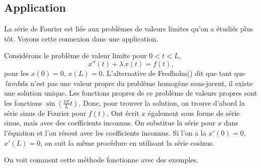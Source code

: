 \subsection{Application}

La série de Fourier est liée aux problèmes de valeurs limites
qu'on a étudiés plus tôt. Voyons cette connexion dans une application.

Considérons le problème de valeur limite pour $0 < t < L$,
\begin{equation*}
x''(t) + \lambda\, x(t) = f(t) ,
\end{equation*}
pour les \emph{}
$x(0) = 0$, $x(L) = 0$.
L'alternative de Fredholm()
dit que tant que $ \ lambda $ n'est pas une valeur propre du problème homogène sous-jacent, il existe une solution unique.
Les fonctions propres de ce problème de valeurs propres sont les fonctions
$\sin \left( \frac{n \pi}{L} t \right)$.
Donc, pour trouver la solution, on trouve d'abord la série sinus de Fourier pour $ f (t) $.
Ont écrit $ x $ également sous forme de série sinus, mais avec des coefficients inconnus.
On substitue la série pour $ x $ dans l'équation et l'on résout avec les coefficients inconnus.
Si l'on a
la \emph{}
$x'(0) = 0$, $x'(L) = 0$, on suit la même procédure en utilisant la série cosinus.

On voit comment cette méthode fonctionne avec des exemples.

